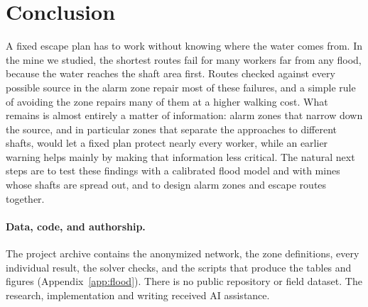 \documentclass[11pt,a4paper]{article}
\begin{document}
\section{Conclusion}
A fixed escape plan has to work without knowing where the water comes from. In the mine we studied, the shortest routes fail for many workers far from any flood, because the water reaches the shaft area first. Routes checked against every possible source in the alarm zone repair most of these failures, and a simple rule of avoiding the zone repairs many of them at a higher walking cost. What remains is almost entirely a matter of information: alarm zones that narrow down the source, and in particular zones that separate the approaches to different shafts, would let a fixed plan protect nearly every worker, while an earlier warning helps mainly by making that information less critical. The natural next steps are to test these findings with a calibrated flood model and with mines whose shafts are spread out, and to design alarm zones and escape routes together.

\paragraph{Data, code, and authorship.}
The project archive contains the anonymized network, the zone definitions, every individual result, the solver checks, and the scripts that produce the tables and figures (Appendix~\ref{app:flood}). There is no public repository or field dataset. The research, implementation and writing received AI assistance.
\end{document}
